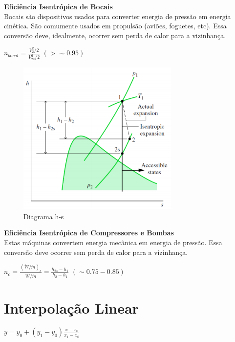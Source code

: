 \documentclass[a4paper, 12pt]{article}
\begin{document}
\textbf{Eficiência Isentrópica de Bocais}\\
Bocais são dispositivos usados para converter energia de pressão em
energia cinética. São comumente usados em propulsão (aviões,
foguetes, etc). Essa conversão deve, idealmente, ocorrer sem perda de
calor para a vizinhança.
	\begin{center}
		\large
		$ n_{bocal} = \frac{V_2^2/2}{V^2_{2s}/2} $ 
		$ (>\sim 0.95) $
	\end{center}
	\begin{figure}[h]
		\includegraphics[width = 8cm]{hss.png}
		\centering
		\caption{Diagrama h-s}
	\end{figure}

\textbf{Eficiência Isentrópica de Compressores e Bombas}\\
Estas máquinas convertem energia mecânica em energia de
pressão. Essa conversão deve ocorrer sem perda de calor para
a vizinhança.
	\begin{center}
		\large
		$ n_c = \frac{(\dot{W}/\dot{m})_s}{\dot{W/\dot{m}}} = \frac{h_{2s} - h_1}{h_2 - h_1}$ $ (\sim0.75 - 0.85) $
	\end{center}

\newpage
\section{Interpolação Linear}
	\begin{center}
		\large
		$ y = y_0 + (y_1 - y_0)\frac{x - x_0}{x_1 - x_0} $
	\end{center}
\end{document}
